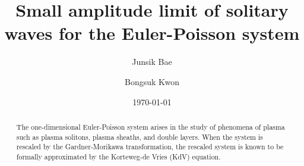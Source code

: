 \documentclass{amsart}
\title[Solitary waves for Euler-Poisson system]{Small amplitude limit of solitary waves for  the Euler-Poisson system}
\author[J. Bae]{Junsik Bae}
\author[B. Kwon]{Bongsuk Kwon}
\date{\today}
\numberwithin{equation}{section}
\theoremstyle{plain}%
\theoremstyle{definition}
\theoremstyle{remark}
\theoremstyle{remark}
\begin{document}
 
\maketitle 

\begin{abstract} 
The one-dimensional Euler-Poisson system arises in the study of phenomena of plasma such as plasma solitons, plasma sheaths, and double layers. When the system is rescaled by the Gardner-Morikawa transformation, the rescaled system is known to be formally approximated by the Korteweg-de Vries (KdV) equation. 

\end{abstract}
\end{document}
